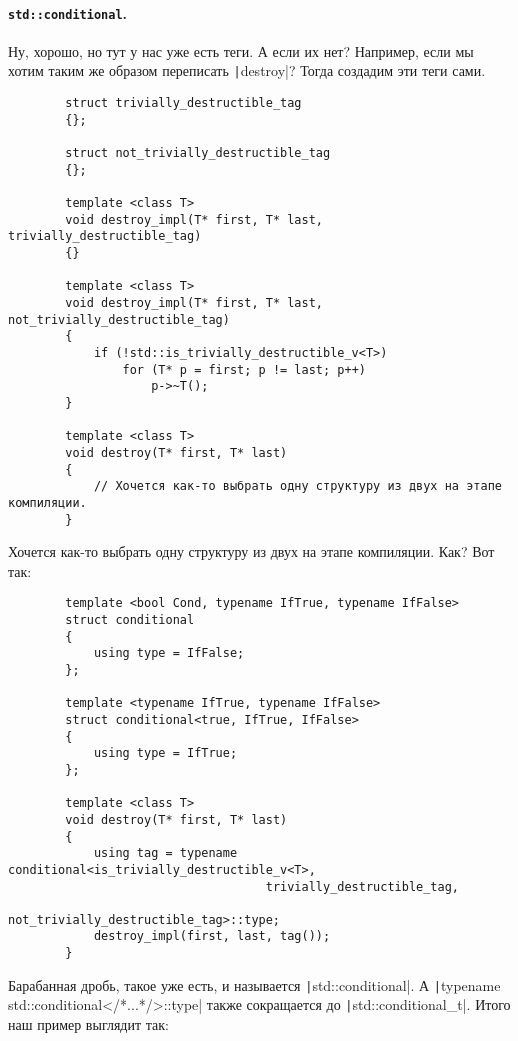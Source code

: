 \documentclass{article}
\begin{document}
    \paragraph{\texttt{std::conditional}.}
    Ну, хорошо, но тут у нас уже есть теги. А если их нет? Например, если мы хотим таким же образом переписать \texttt|destroy|? Тогда создадим эти теги сами.
    \begin{verbatim}
        struct trivially_destructible_tag
        {};

        struct not_trivially_destructible_tag
        {};

        template <class T>
        void destroy_impl(T* first, T* last, trivially_destructible_tag)
        {}

        template <class T>
        void destroy_impl(T* first, T* last, not_trivially_destructible_tag)
        {
            if (!std::is_trivially_destructible_v<T>)
                for (T* p = first; p != last; p++)
                    p->~T();
        }
    
        template <class T>
        void destroy(T* first, T* last)
        {
            // Хочется как-то выбрать одну структуру из двух на этапе компиляции.
        }
    \end{verbatim}
    Хочется как-то выбрать одну структуру из двух на этапе компиляции. Как? Вот так:
    \begin{verbatim}
        template <bool Cond, typename IfTrue, typename IfFalse>
        struct conditional
        {
            using type = IfFalse;
        };

        template <typename IfTrue, typename IfFalse>
        struct conditional<true, IfTrue, IfFalse>
        {
            using type = IfTrue;
        };

        template <class T>
        void destroy(T* first, T* last)
        {
            using tag = typename conditional<is_trivially_destructible_v<T>,
                                    trivially_destructible_tag,
                                    not_trivially_destructible_tag>::type;
            destroy_impl(first, last, tag());
        }
    \end{verbatim}
    Барабанная дробь, такое уже есть, и называется \texttt|std::conditional|. А \texttt|typename std::conditional</*...*/>::type| также сокращается до \texttt|std::conditional_t|. Итого наш пример выглядит так:
\end{document}
